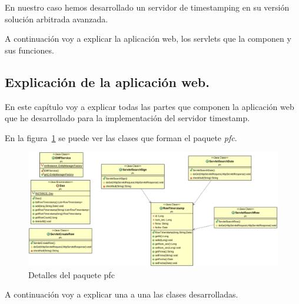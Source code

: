 En nuestro caso hemos desarrollado un servidor de timestamping en su versión solución arbitrada avanzada.

A continuación voy a explicar la aplicación web, los servlets que la componen y sus funciones.

\subsection{Explicación de la aplicación web.}
En este capítulo voy a explicar todas las partes que componen la aplicación web que he desarrollado para la implementación del servidor timestamp.

En la figura~\ref{fig:paquete_pfc} se puede ver las clases que forman el paquete \textit{pfc}.

\begin{figure}
  \centering
    \includegraphics[scale=0.5]{./GoogleAppEngine/imagenes/UML_pfc.png}
  \caption{Detalles del paquete pfc}
  \label{fig:paquete_pfc}
\end{figure}

A continuación voy a explicar una a una las clases desarrolladas.

